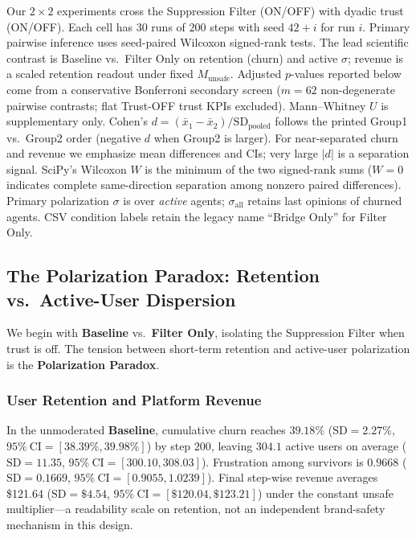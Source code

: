 
Our $2\times2$ experiments cross the Suppression Filter (ON/OFF) with dyadic trust (ON/OFF). Each cell has $30$ runs of $200$ steps with seed $42+i$ for run $i$. Primary pairwise inference uses seed-paired Wilcoxon signed-rank tests. The lead scientific contrast is Baseline vs.\ Filter Only on retention (churn) and active $\sigma$; revenue is a scaled retention readout under fixed $M_{\mathrm{unsafe}}$. Adjusted $p$-values reported below come from a conservative Bonferroni secondary screen ($m=62$ non-degenerate pairwise contrasts; flat Trust-OFF trust KPIs excluded). Mann--Whitney $U$ is supplementary only. Cohen's $d=(\bar x_1-\bar x_2)/\mathrm{SD}_{\mathrm{pooled}}$ follows the printed Group1 vs.\ Group2 order (negative $d$ when Group2 is larger). For near-separated churn and revenue we emphasize mean differences and CIs; very large $|d|$ is a separation signal. SciPy's Wilcoxon $W$ is the minimum of the two signed-rank sums ($W=0$ indicates complete same-direction separation among nonzero paired differences). Primary polarization $\sigma$ is over \emph{active} agents; $\sigma_{\mathrm{all}}$ retains last opinions of churned agents. CSV condition labels retain the legacy name ``Bridge Only'' for Filter Only.

\subsection{The Polarization Paradox: Retention vs.\ Active-User Dispersion}
We begin with \textbf{Baseline} vs.\ \textbf{Filter Only}, isolating the Suppression Filter when trust is off. The tension between short-term retention and active-user polarization is the \textbf{Polarization Paradox}.

\subsubsection{User Retention and Platform Revenue}

In the unmoderated \textbf{Baseline}, cumulative churn reaches $39.18\%$ ($\text{SD} = 2.27\%$, $95\%\ \text{CI} = [38.39\%, 39.98\%]$) by step $200$, leaving $304.1$ active users on average ($\text{SD} = 11.35$, $95\%\ \text{CI} = [300.10, 308.03]$). Frustration among survivors is $0.9668$ ($\text{SD} = 0.1669$, $95\%\ \text{CI} = [0.9055, 1.0239]$). Final step-wise revenue averages \$121.64 ($\text{SD} = \$4.54$, $95\%\ \text{CI} = [\$120.04, \$123.21]$) under the constant unsafe multiplier---a readability scale on retention, not an independent brand-safety mechanism in this design.

